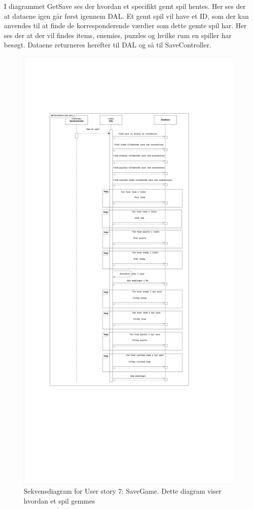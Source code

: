 I diagrammet GetSave ses der hvordan et specifikt gemt spil hentes. Her ses der at dataene igen går først igennem DAL. Et gemt spil vil have et ID, som der kan anvendes til at finde de korresponderende værdier som dette gemte spil har. Her ses der at der vil findes items, enemies, puzzles og hvilke rum en spiller har besøgt. Dataene returneres herefter til DAL og så til SaveController.

\begin{figure}[H]
\centering
\includegraphics[width = \textwidth]{02-Body/Images/SaveGameDB.pdf}
\caption{Sekvensdiagram for User story 7: SaveGame. Dette diagram viser hvordan et spil gemmes}
\label{fig:SaveGameDB}
\end{figure}

